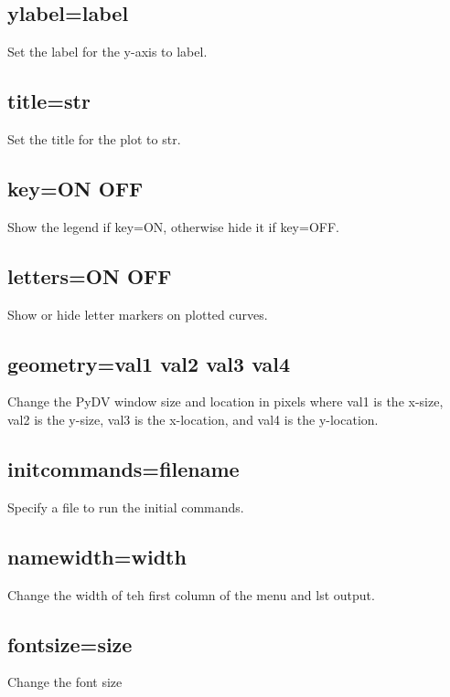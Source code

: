\documentclass[letterpaper,10pt,english]{sphinxmanual}
\begin{document}
\subsection{ylabel=label}
\label{\detokenize{pdvrc:ylabel-label}}
Set the label for the y-axis to label.


\subsection{title=str}
\label{\detokenize{pdvrc:title-str}}
Set the title for the plot to str.


\subsection{key=ON \textbar{} OFF}
\label{\detokenize{pdvrc:key-on-off}}
Show the legend if key=ON, otherwise hide it if key=OFF.


\subsection{letters=ON \textbar{} OFF}
\label{\detokenize{pdvrc:letters-on-off}}
Show or hide letter markers on plotted curves.


\subsection{geometry=val1 val2 val3 val4}
\label{\detokenize{pdvrc:geometry-val1-val2-val3-val4}}
Change the PyDV window size and location in pixels where val1 is the x-size, val2 is the y-size, val3 is the x-location, and val4 is the y-location.


\subsection{initcommands=filename}
\label{\detokenize{pdvrc:initcommands-filename}}
Specify a file to run the initial commands.


\subsection{namewidth=width}
\label{\detokenize{pdvrc:namewidth-width}}
Change the width of teh first column of the menu and lst output.


\subsection{fontsize=size}
\label{\detokenize{pdvrc:fontsize-size}}
Change the font size
\end{document}
